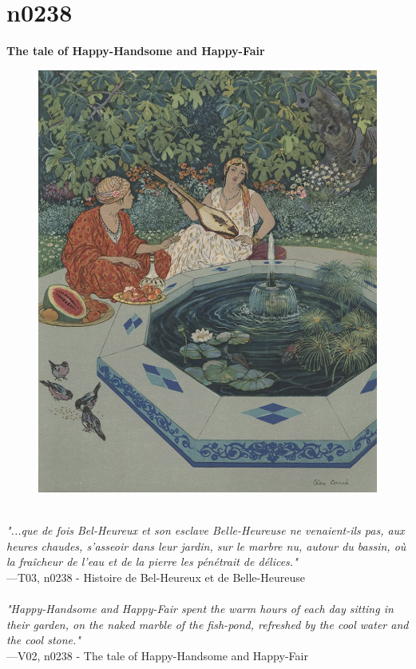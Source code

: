\documentclass[../Carre_nights.tex]{subfiles}
\begin{document}
\newpage

\section{n0238}
\textbf{\Large{The tale of Happy-Handsome and Happy-Fair}} \\

\begin{figure}[ht]
\centering
\includegraphics[height=\figsize]{illustrations/volume_3/T03, n0238 - Histoire de Bel-Heureux et de Belle-Heureuse.jpg}
\end{figure}

\textit{\\
"...que de fois Bel-Heureux et son esclave Belle-Heureuse ne venaient-ils pas, aux heures chaudes, s’asseoir dans leur jardin, sur le marbre nu, autour du bassin, où la fraîcheur de l’eau et de la pierre les pénétrait de délices."} \\
—T03, n0238 - Histoire de Bel-Heureux et de Belle-Heureuse \\~\\
\textit{"Happy-Handsome and Happy-Fair spent the warm hours of each day sitting in their garden, on the naked marble of the fish-pond, refreshed by the cool water and the cool stone."} \\
—V02, n0238 - The tale of Happy-Handsome and Happy-Fair
\end{document}
